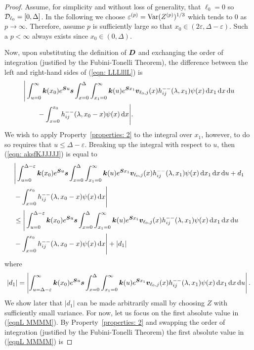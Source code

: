 \begin{proof}
	Assume, for simplicity and without loss of generality, that \(\ell_0=0\) so \(\mathcal{D}_{\ell_0}=[0,\Delta]\). In the following we choose \(\varepsilon^{(p)}=\mathrm{Var}(Z^{(p)})^{1/3}\) which tends to 0 as \(p\to\infty\). Therefore, assume \(p\) is sufficiently large so that \(x_0\in(2\varepsilon,\Delta-\varepsilon)\). Such a \(p<\infty\) always exists since \(x_0\in(0,\Delta)\). 
	
	Now, upon substituting the definition of \(\boldsymbol D\) and exchanging the order of integration (justified by the Fubini-Tonelli Theorem), the difference between the left and right-hand sides of (\ref{eqn: LLLlllL}) is 
	\begin{align}
		&\Bigg|\int_{u=0}^\infty \boldsymbol k(x_0)e^{\boldsymbol Su}\boldsymbol s \int_{x=0}^{\Delta}  \int_{x_1=0}^\infty \boldsymbol k(u)  e^{\boldsymbol S x_1} {\boldsymbol v}_{\ell_0,j}(x) h_{ij}^{--}(\lambda, x_1) \psi(x) \, \mathrm{d} x_1 \, \mathrm{d} x \, \mathrm{d} u\nonumber
		\\&{}\qquad {} - \int_{x=0}^{x_0} h_{ij}^{--}(\lambda, x_0 - x)\psi(x)\, \mathrm{d} x\Bigg|.\label{eqn: aksfKJJJJJ}
	\end{align}
	We wish to apply Property~\ref{properties: 2} to the integral over \(x_1\), however, to do so requires that \(u\leq \Delta-\varepsilon\). Breaking up the integral with respect to \(u\), then (\ref{eqn: aksfKJJJJJ}) is equal to 
	\begin{align}
		&\Bigg|\int_{u=0}^{\Delta-\varepsilon} \boldsymbol k(x_0)e^{\boldsymbol Su}\boldsymbol s \int_{x=0}^{\Delta}  \int_{x_1=0}^\infty \boldsymbol k(u)  e^{\boldsymbol S x_1} {\boldsymbol v}_{\ell_0,j}(x) h_{ij}^{--}(\lambda, x_1) \psi(x) \, \mathrm{d} x_1 \, \mathrm{d} x \, \mathrm{d} u + d_1 \nonumber
		\\&{}  - \int_{x=0}^{x_0} h_{ij}^{--}(\lambda, x_0 - x)\psi(x)\, \mathrm{d} x\Bigg|
		\\&\leq \Bigg|\int_{u=0}^{\Delta-\varepsilon} \boldsymbol k(x_0)e^{\boldsymbol Su}\boldsymbol s \int_{x=0}^{\Delta}  \int_{x_1=0}^\infty \boldsymbol k(u)  e^{\boldsymbol S x_1} {\boldsymbol v}_{\ell_0,j}(x) h_{ij}^{--}(\lambda, x_1) \psi(x) \, \mathrm{d} x_1 \, \mathrm{d} x \, \mathrm{d} u\nonumber
		\\&{} - \int_{x=0}^{x_0} h_{ij}^{--}(\lambda, x_0 - x)\psi(x)\, \mathrm{d} x\Bigg| +|d_1| \label{eqnL MMMM}
	\end{align}
	where 
	\[|d_1|=\left|\int_{u=\Delta-\varepsilon}^\infty \boldsymbol k(x_0)e^{\boldsymbol Su}\boldsymbol s \int_{x=0}^{\Delta}  \int_{x_1=0}^\infty \boldsymbol k(u)  e^{\boldsymbol S x_1} {\boldsymbol v}_{\ell_0,j}(x) h_{ij}^{--}(\lambda, x_1) \psi(x) \, \mathrm{d} x_1 \, \mathrm{d} x \, \mathrm{d} u\right|.\]
	We show later that \(|d_1|\) can be made arbitrarily small by choosing \(Z\) with sufficiently small variance.  For now, let us focus on the first absolute value in (\ref{eqnL MMMM}). By Property~\ref{properties: 2} and swapping the order of integration (justified by the Fubini-Tonelli Theorem) the first absolute value in (\ref{eqnL MMMM}) is 

\end{proof}
